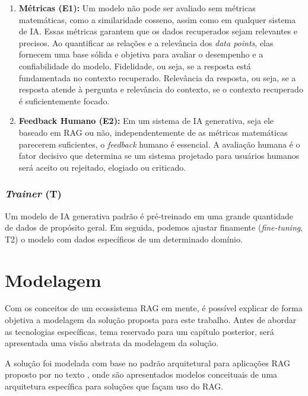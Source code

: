 \documentclass[a4paper, 12pt]{article}
\newcommand{\citeb}[1]{\bibleftbracket\cite{#1}\bibrightbracket}
\begin{document}
    \begin{enumerate}
        \item \textbf{Métricas (E1):} Um modelo não pode ser avaliado sem métricas matemáticas, como a similaridade cosseno, assim como em qualquer sistema de IA. Essas métricas garantem que os dados recuperados sejam relevantes e precisos. Ao quantificar as relações e a relevância dos \textit{data points}, elas fornecem uma base sólida e objetiva para avaliar o desempenho e a confiabilidade do modelo. Fidelidade, ou seja, se a resposta está fundamentada no contexto recuperado. Relevância da resposta, ou seja, se a resposta atende à pergunta e relevância do contexto, se o contexto recuperado é suficientemente focado.
        \item \textbf{Feedback Humano (E2):} \label{sec:human_feedback} Em um sistema de IA generativa, seja ele baseado em RAG ou não, independentemente de as métricas matemáticas parecerem suficientes, o \textit{feedback} humano é essencial. A avaliação humana é o fator decisivo que determina se um sistema projetado para usuários humanos será aceito ou rejeitado, elogiado ou criticado.
    \end{enumerate}
    
    \subsubsection{\textit{Trainer} (T)}

    Um modelo de IA generativa padrão é pré-treinado em uma grande quantidade de dados de propósito geral. Em seguida, podemos ajustar finamente (\textit{fine-tuning}, T2) o modelo com dados específicos de um determinado domínio.
    
    \clearpage
    
    \section{Modelagem}

    Com os conceitos de um ecossistema RAG em mente, é possível explicar de forma objetiva a modelagem da solução proposta para este trabalho. Antes de abordar as tecnologias específicas, tema reservado para um capítulo posterior, será apresentada uma visão abstrata da modelagem da solução.

    A solução foi modelada com base no padrão arquitetural para aplicações RAG proposto por \citeauthor{ibm_rag} no texto \textit{} \citeb{ibm_rag}, onde são apresentados modelos conceituais de uma arquitetura específica para soluções que façam uso do RAG.
\end{document}
